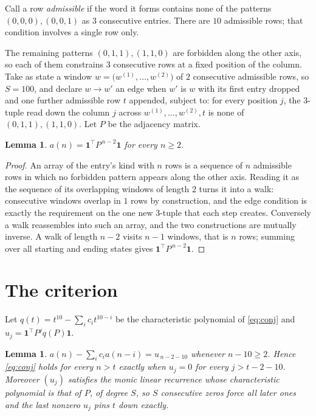 \documentclass[11pt,a4paper]{article}
\theoremstyle{plain}
\newtheorem{lemma}[theorem]{Lemma}
\theoremstyle{definition}
\begin{document}
Call a row \emph{admissible} if the word it forms contains none of the patterns
$(0,0,0), (0,0,1)$ as $3$ consecutive entries. There are $10$ admissible rows; that condition
involves a single row only.

The remaining patterns $(0,1,1), (1,1,0)$ are forbidden along the other axis, so each of them
constrains $3$ consecutive rows at a fixed position of the column. Take as state a
window $w=\bigl(w^{(1)},\dots,w^{(2)}\bigr)$ of $2$ consecutive admissible
rows, so $S=100$, and declare $w\to w'$ an edge when $w'$ is $w$ with its first entry
dropped and one further admissible row $t$ appended, subject to: for every position
$j$, the $3$-tuple read down the column $j$ across $w^{(1)},\dots,w^{(2)},t$
is none of $(0,1,1), (1,1,0)$. Let $P$ be the adjacency matrix.

\begin{lemma}\label{lem:walk}
$a(n)=\mathbf{1}^{\!\top}P^{\,n-2}\mathbf{1}$ for every $n\ge2$.
\end{lemma}

\begin{proof}
An array of the entry's kind with $n$ rows is a sequence of $n$ admissible rows in
which no forbidden pattern appears along the other axis. Reading it as the sequence of its
overlapping windows of length $2$ turns it into a walk: consecutive windows overlap in
$1$ rows by construction, and the edge condition is exactly the requirement on the one
new $3$-tuple that each step creates. Conversely a walk reassembles into such an array,
and the two constructions are mutually inverse. A walk of length $n-2$ visits $n-1$
windows, that is $n$ rows; summing over all starting and ending states gives
$\mathbf{1}^{\!\top}P^{\,n-2}\mathbf{1}$.
\end{proof}

\section{The criterion}

Let $q(t)=t^{10}-\sum_i c_i t^{10-i}$ be the characteristic polynomial of
\eqref{eq:conj} and $u_j=\mathbf{1}^{\!\top}P^{j}q(P)\mathbf{1}$.

\begin{lemma}\label{lem:crit}
$a(n)-\sum_i c_i a(n-i)=u_{\,n-2-10}$ whenever $n-10\ge2$. Hence
\eqref{eq:conj} holds for every $n>t$ exactly when $u_j=0$ for every
$j>t-2-10$. Moreover $(u_j)$ satisfies the monic linear recurrence whose
characteristic polynomial is that of $P$, of degree $S$, so $S$ consecutive zeros force all
later ones and the last nonzero $u_j$ pins $t$ down exactly.
\end{lemma}
\end{document}
